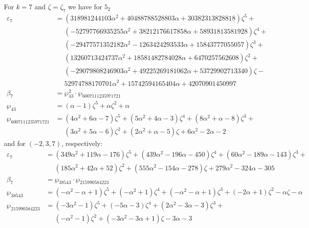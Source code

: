 \documentclass[12pt]{amsart}
\theoremstyle{definition}
\def\a{\alpha}
\def\z{\zeta}
\def\z{\zeta}
\begin{document}
\noindent 
For $k=7$ and $\zeta=\zeta_7$ we have for $5_2$
{\small
\begin{align*}
\varepsilon_{7} &= 
(318981244103 \a^2 + 40488788528803 \a + 30382313828818) \z^5 +
\\ & \quad\,\,  
(-52797766935255 \a^2 + 38212176617858 \a + 58931813581928) \z^4 + 
\\ & \quad\,\,
(-29477571352182 \a^2 - 1263424293533 \a + 15843777055057) \z^3 + 
\\ & \quad\,\,
(13260713424737 \a^2 + 18581482784028 \a + 6470257562608) \z^2 + 
\\ & \quad\,\,
(-29079808246903 \a^2 + 49225269181062 \a + 53729902713340) \z - 
\\ & \quad\,\,
52974788170701 \a^2 + 15742594165404 \a + 42070901450997
\\
\beta_{7} &= \wp_{43}^2 \cdot \wp_{6007111235971721}  \\
\wp_{43} &=(\a - 1) \z^5 + \a \z^2 + \a
\\
\wp_{6007111235971721} &=
(4 \a^2 + 6 \a - 7) \z^5 + (5 \a^2 + 4 \a - 3) \z^4 + (8 \a^2 + \a - 8) \z^3 +
\\ & \quad\,\, 
(3 \a^2 + 5 \a - 6) \z^2 + (2 \a^2 + \a - 5) \z + 6 \a^2 - 2 \a - 2
\end{align*}
}
and for $(-2,3,7)$, respectively:
{\small
\begin{align*}
\varepsilon_{7} &= 
(349 \a^2 + 119 \a - 176) \z^5 + (439 \a^2 - 196 \a - 450) \z^4 + (60 \a^2 - 189 \a - 143) \z^3 + 
\\ & \quad\,\,
(185 \a^2 + 42 \a + 52) \z^2 + (555 \a^2 - 154 \a - 278) \z + 279 \a^2 - 324 \a - 305
\\
\beta_{7} &= \wp_{38543} \cdot \wp_{215990584223}  \\
\wp_{38543} &=
(-\a^2 - \a + 1) \z^5 + (-\a^2 + 1) \z^4 + (-\a^2 - \a + 1) \z^3 + (-2 \a + 1) \z^2 - \a \z - \a
\\
\wp_{215990584223} &=
(-3 \a^2 - 1) \z^5 + (-5 \a - 3) \z^4 + (2 \a^2 - 3 \a - 3) \z^3 + 
\\ & \quad\,\,
(-\a^2 - 1) \z^2 + (-3 \a^2 - 3 \a + 1) \z - 3 \a - 3
\end{align*}
}
\end{document}
